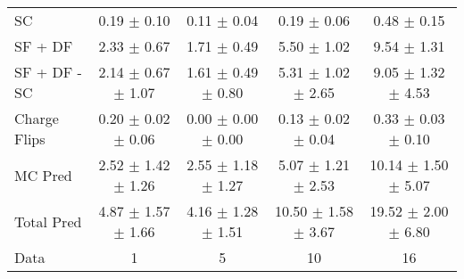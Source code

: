 \begin{tabular}{l|cccc}
                                 SC &  0.19 $\pm$  0.10 &  0.11 $\pm$  0.04 &  0.19 $\pm$  0.06 &  0.48 $\pm$  0.15 \\
                            SF + DF &  2.33 $\pm$  0.67 &  1.71 $\pm$  0.49 &  5.50 $\pm$  1.02 &  9.54 $\pm$  1.31 \\
\hline
                       SF + DF - SC &  2.14 $\pm$  0.67 $\pm$  1.07 &  1.61 $\pm$  0.49 $\pm$  0.80 &  5.31 $\pm$  1.02 $\pm$  2.65 &  9.05 $\pm$  1.32 $\pm$  4.53 \\
\hline\hline
                       Charge Flips &  0.20 $\pm$  0.02 $\pm$  0.06 &  0.00 $\pm$  0.00 $\pm$  0.00 &  0.13 $\pm$  0.02 $\pm$  0.04 &  0.33 $\pm$  0.03 $\pm$  0.10 \\
\hline
                            MC Pred &  2.52 $\pm$  1.42 $\pm$  1.26 &  2.55 $\pm$  1.18 $\pm$  1.27 &  5.07 $\pm$  1.21 $\pm$  2.53 & 10.14 $\pm$  1.50 $\pm$  5.07 \\
\hline
                         Total Pred &  4.87 $\pm$  1.57 $\pm$  1.66 &  4.16 $\pm$  1.28 $\pm$  1.51 & 10.50 $\pm$  1.58 $\pm$  3.67 & 19.52 $\pm$  2.00 $\pm$  6.80 \\
\hline\hline
                               Data &     1 &     5 &    10 &    16 \\
\hline\hline
\end{tabular}

